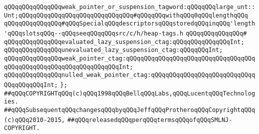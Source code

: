 \verb|qQQqqQQqqQQqqQQqweak_pointer_or_suspension_tagword:qQQqqQQqlarge_unt::Unt;qQQqqQQqqQQqqQQqqQQqqQQqqQQqqQQq#qQQqqQQqwithqQQq0qQQqlengthqQQq|\newline
\newline
\verb|qQQqqQQqqQQqqQQq#qQQqSpecialqQQqdescriptorsqQQqstoredqQQqinqQQq'length'qQQqslotsqQQq--qQQqseeqQQqqQQqsrc/c/h/heap-tags.h|\newline
\verb|qQQqqQQqqQQqqQQq#|\newline
\verb|qQQqqQQqqQQqqQQqevaluated_lazy_suspension_ctag:qQQqqQQqqQQqqQQqInt;|\newline
\verb|qQQqqQQqqQQqqQQqunevaluated_lazy_suspension_ctag:qQQqqQQqInt;|\newline
\verb|qQQqqQQqqQQqqQQqweak_pointer_ctag:qQQqqQQqqQQqqQQqqQQqqQQqqQQqqQQqqQQqqQQqqQQqqQQqqQQqqQQqqQQqqQQqqQQqInt;|\newline
\verb|qQQqqQQqqQQqqQQqnulled_weak_pointer_ctag:qQQqqQQqqQQqqQQqqQQqqQQqqQQqqQQqqQQqqQQqInt;|\newline
\verb|};|\newline
\newline
\newline
\newline
\newline
\verb|##qQQqCOPYRIGHTqQQq(c)qQQq1998qQQqBellqQQqLabs,qQQqLucentqQQqTechnologies.|\newline
\verb|##qQQqSubsequentqQQqchangesqQQqbyqQQqJeffqQQqProtheroqQQqCopyrightqQQq(c)qQQq2010-2015,|\newline
\verb|##qQQqreleasedqQQqperqQQqtermsqQQqofqQQqSMLNJ-COPYRIGHT.|\newline

